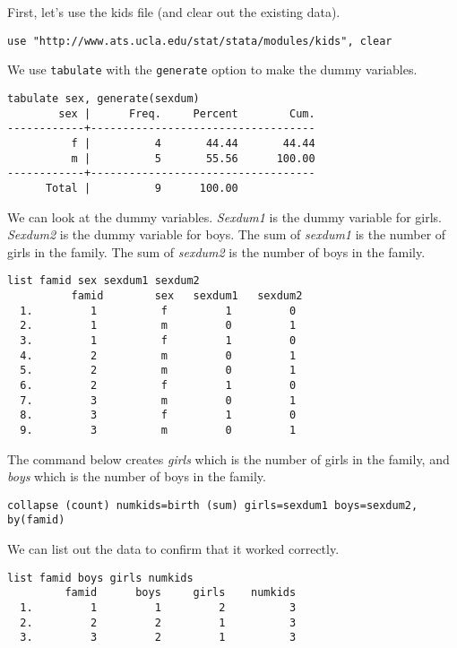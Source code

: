 First, let's use the kids file (and clear out the existing data).

\begin{lstlisting}
use "http://www.ats.ucla.edu/stat/stata/modules/kids", clear
\end{lstlisting}

We use \lstinline{tabulate} with the \lstinline{generate} option to make the dummy variables.

\begin{lstlisting}
tabulate sex, generate(sexdum)
        sex |      Freq.     Percent        Cum.
------------+-----------------------------------
          f |          4       44.44       44.44
          m |          5       55.56      100.00
------------+-----------------------------------
      Total |          9      100.00
\end{lstlisting}

We can look at the dummy variables. \textit{Sexdum1} is the dummy variable for girls. \textit{Sexdum2} is the dummy variable for boys. The sum of \textit{sexdum1} is the number of girls in the family. The sum of \textit{sexdum2} is the number of boys in the family.

\begin{lstlisting}
list famid sex sexdum1 sexdum2
          famid        sex   sexdum1   sexdum2
  1.         1          f         1         0
  2.         1          m         0         1
  3.         1          f         1         0
  4.         2          m         0         1
  5.         2          m         0         1
  6.         2          f         1         0
  7.         3          m         0         1
  8.         3          f         1         0
  9.         3          m         0         1
\end{lstlisting}

The command below creates \textit{girls} which is the number of girls in the family, and \textit{boys} which is the number of boys in the family.

\begin{lstlisting}
collapse (count) numkids=birth (sum) girls=sexdum1 boys=sexdum2, by(famid)
\end{lstlisting}

We can list out the data to confirm that it worked correctly.

\begin{lstlisting}
list famid boys girls numkids
         famid      boys     girls    numkids
  1.         1         1         2          3
  2.         2         2         1          3
  3.         3         2         1          3
\end{lstlisting}


